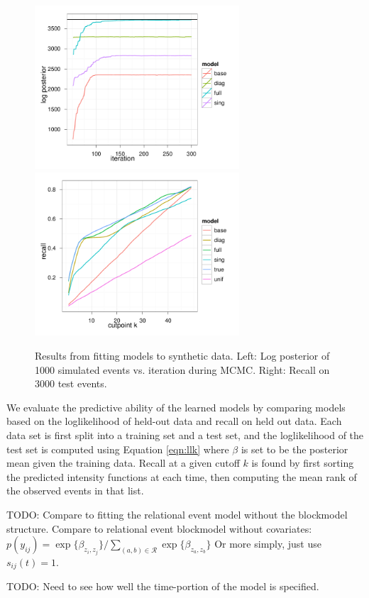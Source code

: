 \documentclass[11pt]{article}
\begin{document}
\begin{figure}
\center
\includegraphics[width=3in]{../figs/syn/logposterior.pdf}
\includegraphics[width=3in]{../figs/syn/test-recall.pdf}
\caption{Results from fitting models to synthetic data. Left: Log posterior of 1000 simulated events vs. iteration during MCMC.  Right: Recall on 3000 test events.}
\label{fig:synresults}
\end{figure}
We evaluate the predictive ability of the learned models by comparing models based on the loglikelihood of held-out data and recall on held out data.  Each data set is first split into a training set and a test set, and the loglikelihood of the test set is computed using Equation \ref{eqn:llk} where $\beta$ is set to be the posterior mean given the training data.  Recall at a given cutoff $k$ is found by first sorting the predicted intensity functions at each time, then computing the mean rank of the observed events in that list.

TODO: Compare to fitting the relational event model without the blockmodel structure.  Compare to relational event blockmodel without covariates: $p(y_{ij}) = \exp\{\beta_{z_i,z_j}\} / \sum_{(a,b) \in \mathcal{R}}\exp\{\beta_{z_{a},z_{b}}\} $
Or more simply, just use $s_{ij}(t) = 1$.

TODO: Need to see how well the time-portion of the model is specified.
\end{document}
